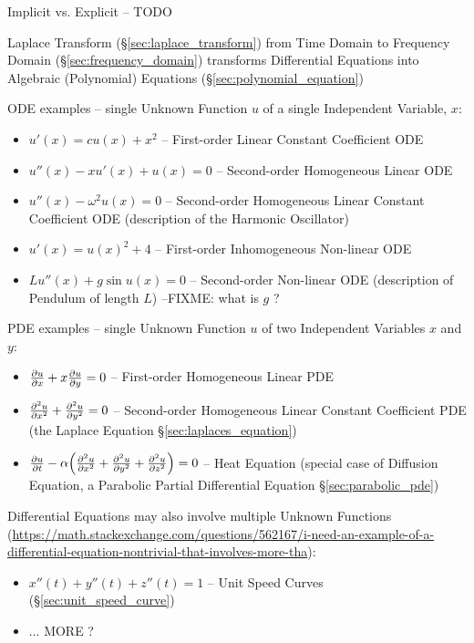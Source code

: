{Implicit vs. Explicit -- TODO

\fist Laplace Transform (\S\ref{sec:laplace_transform}) from Time Domain to
Frequency Domain (\S\ref{sec:frequency_domain}) transforms Differential
Equations into Algebraic (Polynomial) Equations
(\S\ref{sec:polynomial_equation})

ODE examples -- single Unknown Function $u$ of a single Independent Variable,
$x$:
\begin{itemize}
\item $u'(x) = cu(x) + x^2$ -- First-order Linear Constant Coefficient ODE
\item $u''(x) - xu'(x) + u(x) = 0$ -- Second-order Homogeneous Linear ODE
\item $u''(x) - \omega^2u(x) = 0$ -- Second-order Homogeneous Linear Constant
  Coefficient ODE (description of the Harmonic Oscillator)
\item $u'(x) = u(x)^2 + 4$ -- First-order Inhomogeneous Non-linear ODE
\item $Lu''(x) + g\sin{u(x)} = 0$ -- Second-order Non-linear ODE (description of
  Pendulum of length $L$) --FIXME: what is $g$ ?
\end{itemize}

PDE examples -- single Unknown Function $u$ of two Independent Variables $x$ and
$y$:
\begin{itemize}
\item $\frac{\partial{u}}{\partial{x}} + x\frac{\partial{u}}{\partial{y}} = 0$ -- First-order Homogeneous Linear PDE
\item $\frac{\partial{^2u}}{\partial{x^2}} + \frac{\partial{^2u}}{\partial{y^2}} = 0$ -- Second-order Homogeneous
  Linear Constant Coefficient PDE (the Laplace Equation
  \S\ref{sec:laplaces_equation})
\item $\frac{\partial{u}}{\partial{t}} - \alpha\Big(
      \frac{\partial{^2u}}{\partial{x^2}} + \frac{\partial{^2u}}{\partial{y^2}} + \frac{\partial{^2u}}{\partial{z^2}}
    \Big) = 0$ -- Heat Equation (special case of Diffusion Equation, a Parabolic
    Partial Differential Equation \S\ref{sec:parabolic_pde})
\end{itemize}

Differential Equations may also involve multiple Unknown Functions
(\url{https://math.stackexchange.com/questions/562167/i-need-an-example-of-a-differential-equation-nontrivial-that-involves-more-tha}):
\begin{itemize}
  \item $x''(t) + y''(t) + z''(t) = 1$ -- Unit Speed Curves
    (\S\ref{sec:unit_speed_curve})
  \item ... MORE ?
\end{itemize}

}
